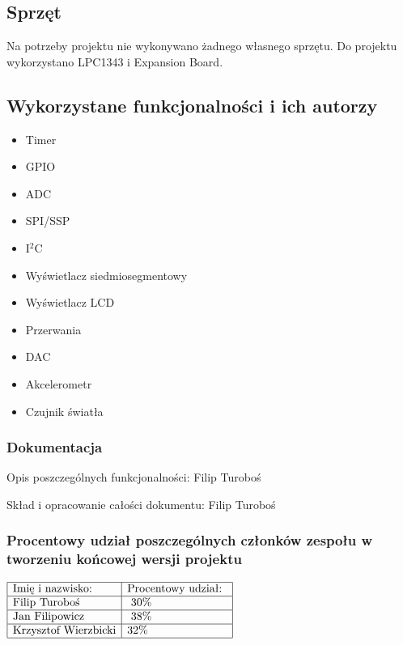 \documentclass[a4paper,12pt,twoside]{article}
\theoremstyle{plain}
\theoremstyle{definition}
\theoremstyle{remark}
\begin{document}
\subsection{Sprzęt}
Na potrzeby projektu nie wykonywano żadnego własnego sprzętu.
Do projektu wykorzystano LPC1343 i Expansion Board.
\subsection{Wykorzystane funkcjonalności i ich autorzy}

\begin{itemize}
	\item Timer
	\item GPIO
	\item ADC
	\item SPI/SSP
	\item I$^2$C
	\item Wyświetlacz siedmiosegmentowy
	\item Wyświetlacz LCD
	\item Przerwania
	\item DAC
	\item Akcelerometr
	\item Czujnik światła
\end{itemize}
\subsubsection{Dokumentacja}
Opis poszczególnych funkcjonalności: Filip Turoboś

Skład i opracowanie całości dokumentu: Filip Turoboś

\subsubsection{Procentowy udział poszczególnych członków zespołu w tworzeniu końcowej wersji projektu}
$\begin{array}{|l|l|l|}
\hline
\textrm{Imię i nazwisko: }& \textrm{Procentowy udział: }\\
\hline
 \textrm{Filip Turoboś}&\textrm{ 30\%}\\
\hline
\textrm{Jan Filipowicz}&\textrm{	38\% 	}\\
\hline
\textrm{Krzysztof Wierzbicki}& \textrm{32\%}\\
\hline
\end{array}$
\newpage
\end{document}
